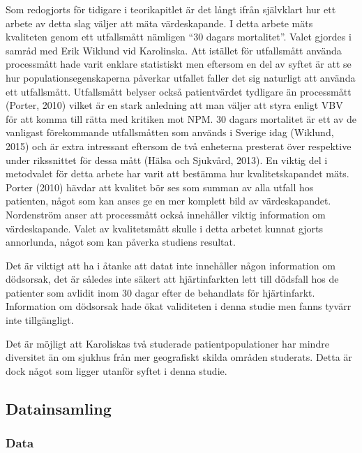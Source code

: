 Som redogjorts för tidigare i teorikapitlet är det långt ifrån självklart hur ett arbete av detta slag väljer att mäta värdeskapande. I detta arbete mäts kvaliteten genom ett utfallsmått nämligen “30 dagars mortalitet”. Valet gjordes i samråd med Erik Wiklund vid Karolinska. Att istället för utfallsmått använda processmått hade varit enklare statistiskt men eftersom en del av syftet är att se hur populationsegenskaperna påverkar utfallet faller det sig naturligt att använda ett utfallsmått. Utfallsmått belyser också patientvärdet tydligare än processmått (Porter, 2010) vilket är en stark anledning att man väljer att styra enligt VBV för att komma till rätta med kritiken mot NPM. 30 dagars mortalitet är ett av de vanligast förekommande utfallsmåtten som används i Sverige idag (Wiklund, 2015) och är extra intressant eftersom de två enheterna presterat över respektive under rikssnittet för dessa mått (Hälsa och Sjukvård, 2013). En viktig del i metodvalet för detta arbete har varit att bestämma hur kvalitetskapandet mäts. Porter (2010) hävdar att kvalitet bör ses som summan av alla utfall hos patienten, något som kan anses ge en mer komplett bild av värdeskapandet. Nordenström anser att processmått också innehåller viktig information om värdeskapande. Valet av kvalitetsmått skulle i detta arbetet kunnat gjorts annorlunda, något som kan påverka studiens resultat.

Det är viktigt att ha i åtanke att datat inte innehåller någon information om dödsorsak, det är således inte säkert att hjärtinfarkten lett till dödsfall hos de patienter som avlidit inom 30 dagar efter de behandlats för hjärtinfarkt. Information om dödsorsak hade ökat validiteten i denna studie men fanns tyvärr inte tillgängligt.

Det är möjligt att Karoliskas två studerade patientpopulationer har mindre diversitet än om sjukhus från mer geografiskt skilda områden studerats. Detta är dock något som ligger utanför syftet i denna studie.

\subsection{Datainsamling}

\subsubsection{Data}

